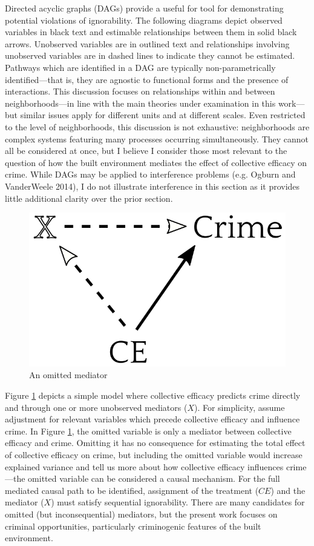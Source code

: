 \documentclass [11pt, proquest] {uwthesis}[2015/03/03]
\begin{document}
Directed acyclic graphs (DAGs) provide a useful for tool for demonstrating potential violations of ignorability. The following diagrams depict observed variables in black text and estimable relationships between them in solid black arrows. Unobserved variables are in outlined text and relationships involving unobserved variables are in dashed lines to indicate they cannot be estimated. Pathways which are identified in a DAG are typically non-parametrically identified---that is, they are agnostic to functional forms and the presence of interactions. This discussion focuses on relationships within and between neighborhoods---in line with the main theories under examination in this work---but similar issues apply for different units and at different scales. Even restricted to the level of neighborhoods, this discussion is not exhaustive: neighborhoods are complex systems featuring many processes occurring simultaneously. They cannot all be considered at once, but I believe I consider those most relevant to the question of how the built environment mediates the effect of collective efficacy on crime. While DAGs may be applied to interference problems (e.g. Ogburn and VanderWeele 2014), I do not illustrate interference in this section as it provides little additional clarity over the prior section.
\begin{figure}

{\centering \includegraphics[width=0.4\linewidth]{./figure/appendix/1_omitted_mediator} 

}

\caption{An omitted mediator}\label{fig:dag1}
\end{figure}
Figure \ref{fig:dag1} depicts a simple model where collective efficacy predicts crime directly and through one or more unobserved mediators (\(X\)). For simplicity, assume adjustment for relevant variables which precede collective efficacy and influence crime. In Figure \ref{fig:dag1}, the omitted variable is only a mediator between collective efficacy and crime. Omitting it has no consequence for estimating the total effect of collective efficacy on crime, but including the omitted variable would increase explained variance and tell us more about how collective efficacy influences crime---the omitted variable can be considered a causal mechanism. For the full mediated causal path to be identified, assignment of the treatment (\(CE\)) and the mediator (\(X\)) must satisfy sequential ignorability. There are many candidates for omitted (but inconsequential) mediators, but the present work focuses on criminal opportunities, particularly criminogenic features of the built environment.
\end{document}
